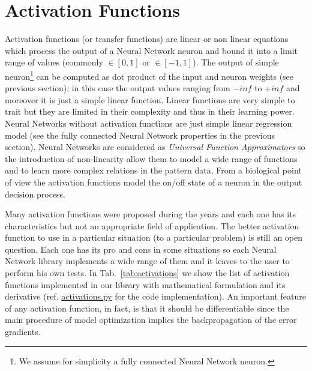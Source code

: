 \documentclass{standalone}
\begin{document}

\section[Activation functions]{Activation Functions}\label{NN:activation}

Activation functions (or transfer functions) are linear or non linear equations which process the output of a Neural Network neuron and bound it into a limit range of values (commonly $\in[0, 1]$ or $\in[-1, 1]$).
The output of simple neuron\footnote{
  We assume for simplicity a fully connected Neural Network neuron.
} can be computed as dot product of the input and neuron weights (see previous section); in this case the output values ranging from $-inf$ to $+inf$ and moreover it is just a simple linear function.
Linear functions are very simple to trait but they are limited in their complexity and thus in their learning power.
Neural Networks without activation functions are just simple linear regression model (see the fully connected Neural Network properties in the previous section).
Neural Networks are considered as \emph{Universal Function Approximators} so the introduction of non-linearity allow them to model a wide range of functions and to learn more complex relations in the pattern data.
From a biological point of view the activation functions model the on/off state of a neuron in the output decision process.

Many activation functions were proposed during the years and each one has its characteristics but not an appropriate field of application.
The better activation function to use in a particular situation (to a particular problem) is still an open question.
Each one has its pro and cons in some situations so each Neural Network library implements a wide range of them and it leaves to the user to perform his own tests.
In Tab.~\ref{tab:activations} we show the list of activation functions implemented in our library with mathematical formulation and its derivative (ref. \href{https://github.com/Nico-Curti/NumPyNet/blob/master/NumPyNet/activations.py}{\textsf{activations.py}} for the code implementation).
An important feature of any activation function, in fact, is that it should be differentiable since the main procedure of model optimization implies the backpropagation of the error gradients.
\end{document}
